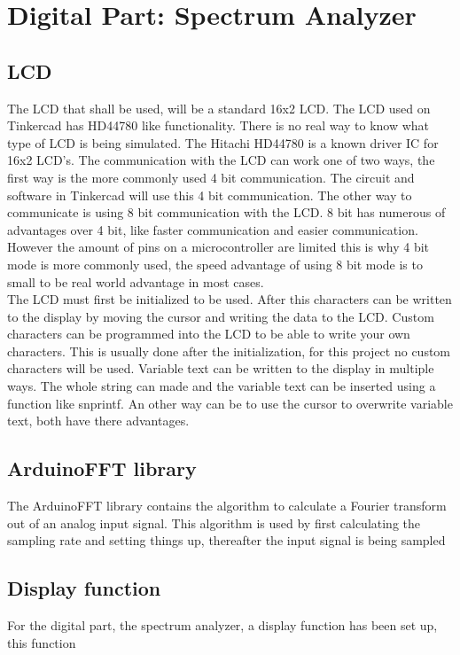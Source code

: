 \section{Digital Part: Spectrum Analyzer}

\subsection{LCD}
The LCD that shall be used, will be a standard 16x2 LCD. The LCD used on Tinkercad has HD44780 like functionality. There is no real way to know what type of LCD is being simulated. The Hitachi HD44780 is a known driver IC for 16x2 LCD's. The communication with the LCD can work one of two ways, the first way is the more commonly used 4 bit communication. The circuit and software in Tinkercad will use this 4 bit communication. The other way to communicate is using 8 bit communication with the LCD. 8 bit has numerous of advantages over 4 bit, like faster communication and easier communication. However the amount of pins on a microcontroller are limited this is why 4 bit mode is more commonly used, the speed advantage of using 8 bit mode is to small to be real world advantage in most cases.
\\
\indent{} The LCD must first be initialized to be used. After this characters can be written to the display by moving the cursor and writing the data to the LCD. Custom characters can be programmed into the LCD to be able to write your own characters. This is usually done after the initialization, for this project no custom characters will be used. Variable text can be written to the display in multiple ways. The whole string can made and the variable text can be inserted using a function like snprintf. An other way can be to use the cursor to overwrite variable text, both have there advantages. 

\subsection{ArduinoFFT library}
The ArduinoFFT library contains the algorithm to calculate a Fourier transform out of an analog input signal. This algorithm is used by first calculating the sampling rate and setting things up, thereafter the input signal is being sampled 

\subsection{Display function}
For the digital part, the spectrum analyzer, a display function has been set up, this function